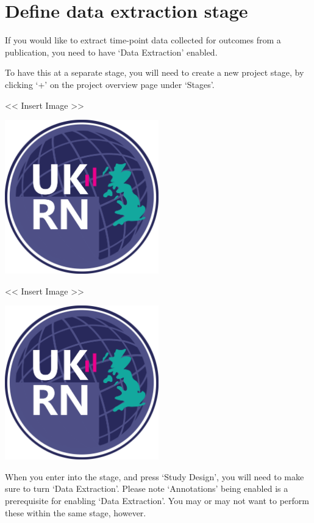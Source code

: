 \documentclass[]{book}
\begin{document}
\section{Define data extraction
stage}\label{define-data-extraction-stage}

If you would like to extract time-point data collected for outcomes from
a publication, you need to have `Data Extraction' enabled.

To have this at a separate stage, you will need to create a new project
stage, by clicking `+' on the project overview page under `Stages'.

\textless{}\textless{} Insert Image \textgreater{}\textgreater{}

\includegraphics[width=0.50000\textwidth,height=0.50000\textwidth]{figs/evidence-triangle.png}

\textless{}\textless{} Insert Image \textgreater{}\textgreater{}

\includegraphics[width=0.50000\textwidth,height=0.50000\textwidth]{figs/evidence-triangle.png}

When you enter into the stage, and press `Study Design', you will need
to make sure to turn `Data Extraction'. Please note `Annotations' being
enabled is a prerequisite for enabling `Data Extraction'. You may or may
not want to perform these within the same stage, however.
\end{document}
